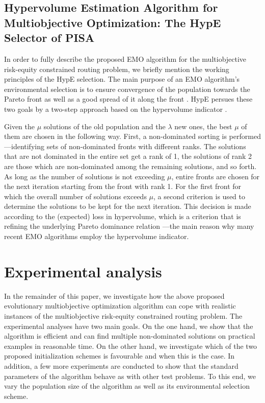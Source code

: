 \documentclass[preprint,12pt]{elsarticle}
\begin{document}
\subsection{Hypervolume Estimation Algorithm for Multiobjective Optimization: The HypE Selector of PISA}
In order to fully describe the proposed EMO algorithm for the multiobjective risk-equity constrained routing problem, we briefly mention the working principles of the HypE selection. The main purpose of an EMO algorithm's environmental selection is to ensure convergence of the population towards the Pareto front as well as a good spread of it along the front \citep{deb2001a}. HypE persues these two goals by a two-step approach based on the hypervolume indicator \citep[see][]{ztlf2003a}.

Given the $\mu$ solutions of the old population and the $\lambda$ new ones, the best $\mu$ of them are chosen in the following way. First, a non-dominated sorting \citep{gold1989a} is performed---identifying sets of non-dominated fronts with different ranks. The solutions that are not dominated in the entire set get a rank of 1, the solutions of rank 2 are those which are non-dominated among the remaining solutions, and so forth. As long as the number of solutions is not exceeding $\mu$, entire fronts are chosen for the next iteration starting from the front with rank 1. For the first front for which the overall number of solutions exceeds $\mu$, a second criterion is used to determine the solutions to be kept for the next iteration. This decision is made according to the (expected) loss in hypervolume, which is a criterion that is refining the underlying Pareto dominance relation \citep{ztb2010a}---the main reason why many recent EMO algorithms employ the hypervolume indicator.


\section{Experimental analysis}
In the remainder of this paper, we investigate how the above proposed evolutionary multiobjective optimization algorithm can cope with realistic instances of the multiobjective risk-equity constrained routing problem. The experimental analyses have two main goals. On the one hand, we show that the algorithm is efficient and can find multiple non-dominated solutions on practical examples in reasonable time. On the other hand, we investigate which of the two proposed initialization schemes is favourable and when this is the case. In addition, a few more experiments are conducted to show that the standard parameters of the algorithm behave as with other test problems. To this end, we vary the population size of the algorithm as well as its environmental selection scheme.
\end{document}
